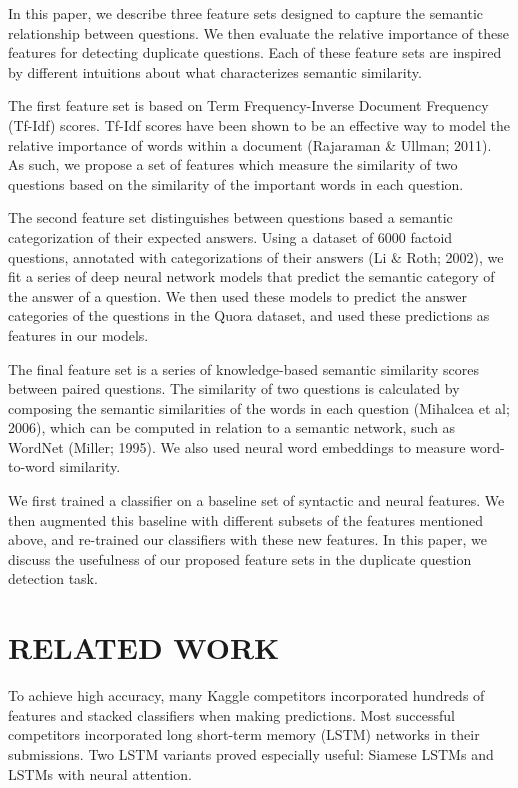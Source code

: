 \documentclass[letterpaper, 10 pt, conference]{ieeeconf}  %
\begin{document}
In this paper, we describe three feature sets designed to capture the semantic relationship between questions. We then evaluate the relative importance of these features for detecting duplicate questions. Each of these feature sets are inspired by different intuitions about what characterizes semantic similarity.

The first feature set is based on Term Frequency-Inverse Document Frequency (Tf-Idf) scores. Tf-Idf scores have been shown to be an effective way to model the relative importance of words within a document (Rajaraman \& Ullman; 2011). As such, we propose a set of features which measure the similarity of two questions based on the similarity of the important words in each question.

The second feature set distinguishes between questions based a semantic categorization of their expected answers. Using a dataset of 6000 factoid questions, annotated with categorizations of their answers (Li \& Roth; 2002), we fit a series of deep neural network models that predict the semantic category of the answer of a question. We then used these models to predict the answer categories of the questions in the Quora dataset, and used these predictions as features in our models.

The final feature set is a series of knowledge-based semantic similarity scores between paired questions. The similarity of two questions is calculated by composing the semantic similarities of the words in each question (Mihalcea et al; 2006), which can be computed in relation to a semantic network, such as WordNet (Miller; 1995). We also used neural word embeddings to measure word-to-word similarity.

We first trained a classifier on a baseline set of syntactic and neural features. We then augmented this baseline with different subsets of the features mentioned above, and re-trained our classifiers with these new features. In this paper, we discuss the usefulness of our proposed feature sets in the duplicate question detection task.


\section{RELATED WORK}

To achieve high accuracy, many Kaggle competitors incorporated hundreds of features and stacked classifiers when making predictions. Most successful competitors incorporated long short-term memory (LSTM) networks in their submissions. Two LSTM variants proved especially useful: Siamese LSTMs and LSTMs with neural attention.
\end{document}
